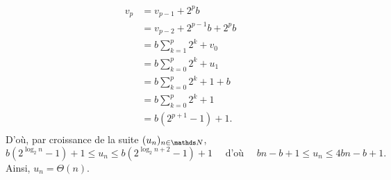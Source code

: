 \begin{enumerate}[label=(\textit{\alph*})]
\begin{align*}
			v_p &= v_{p-1} + 2^p b\\
			&= v_{p-2} + 2^{p-1} b + 2^p b \\
			&= b\sum_{k=1}^p 2^k + v_0 \\
			&= b \sum_{k=0}^p 2^k + u_1 \\
			&= b \sum_{k=0}^p 2^k + 1 + b \\
			&= b \sum_{k=0}^p 2^k + 1 \\
			&= b (2^{p+1} - 1) + 1. \\
		\end{align*}
		D'où, par croissance de la suite $(u_n)_{n\in\N}$, \[
			b (2^{\log_2 n} - 1) + 1 \le u_n \le b(2^{\log_2 n + 2} - 1) + 1
			\quad \text{ d'où } \quad bn - b + 1 \le u_n \le 4bn - b + 1
		.\]Ainsi, $u_n = \Theta(n)$.
\end{enumerate}
